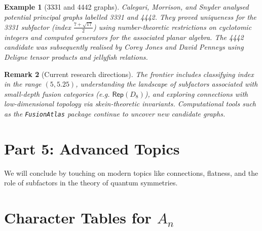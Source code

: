 \documentclass[11pt, a4paper]{article}
\theoremstyle{colored_def}
\theoremstyle{colored_thm}
\theoremstyle{colored_ex}
\newtheorem{example}{Example}[section]
\newtheorem{remark}[example]{Remark}
\begin{document}
\begin{example}[3331 and 4442 graphs]\label{ex:3331-4442}
Calegari, Morrison, and Snyder analysed potential principal graphs labelled 3331 and 4442. They proved uniqueness for the 3331 subfactor (index $\frac{7+\sqrt{17}}{2}$) using number-theoretic restrictions on cyclotomic integers and computed generators for the associated planar algebra. The 4442 candidate was subsequently realised by Corey Jones and David Penneys using Deligne tensor products and jellyfish relations.
\end{example}

\begin{remark}[Current research directions]
The frontier includes classifying index in the range $(5, 5.25)$, understanding the landscape of subfactors associated with small-depth fusion categories (e.g. $\mathsf{Rep}(D_8)$), and exploring connections with low-dimensional topology via skein-theoretic invariants. Computational tools such as the \texttt{FusionAtlas} package continue to uncover new candidate graphs.
\end{remark}

\section{Part 5: Advanced Topics}
We will conclude by touching on modern topics like connections, flatness, and the role of subfactors in the theory of quantum symmetries.

\appendix
\section{Character Tables for \texorpdfstring{$A_n$}{A\_n}}

\end{document}
